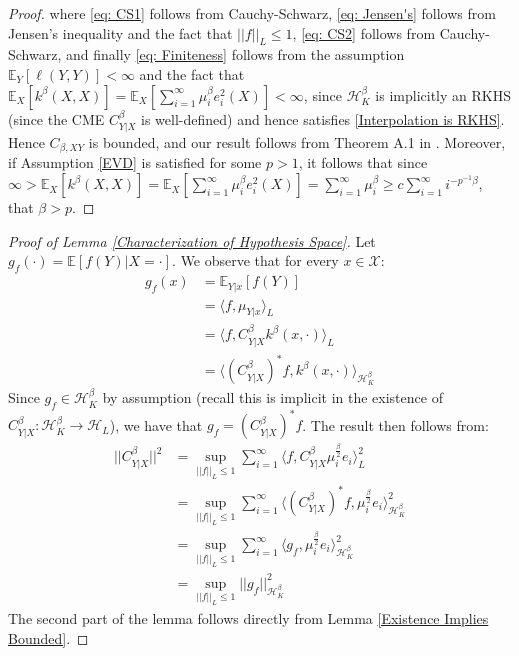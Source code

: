 \documentclass[accepted]{article}
\theoremstyle{definition}
\begin{document}
\begin{proof}
where \eqref{eq: CS1} follows from Cauchy-Schwarz, \eqref{eq: Jensen's} follows from Jensen's inequality and the fact that $||f||_{L} \leq 1$, \eqref{eq: CS2} follows from Cauchy-Schwarz, and finally \eqref{eq: Finiteness} follows from the assumption $\mathbb{E}_Y[\ell(Y, Y)] < \infty$ and the fact that $\mathbb{E}_{X}[k^{\beta}(X, X)] = \mathbb{E}_{X}[\sum_{i = 1}^{\infty} \mu^{\beta}_i e^2_i(X)] < \infty$, since $\mathcal{H}^{\beta}_{K}$ is implicitly an RKHS (since the CME $C^{\beta}_{Y|X}$ is well-defined) and hence satisfies \eqref{Interpolation is RKHS}. Hence $C_{\beta, XY}$ is bounded, and our result follows from Theorem A.1 in \cite{klebanov2020rigorous}. Moreover, if Assumption \ref{EVD} is satisfied for some $p > 1$, it follows that since $\infty > \mathbb{E}_{X}[k^{\beta}(X, X)] = \mathbb{E}_{X}[\sum_{i = 1}^{\infty} \mu^{\beta}_i e^2_i(X)] = \sum_{i = 1}^{\infty} \mu^{\beta}_i \geq c\sum_{i = 1}^{\infty} i^{-p^{-1}\beta}$, that $\beta > p$. 
\end{proof}
\begin{proof}[Proof of Lemma \ref{Characterization of Hypothesis Space}]
Let $g_f(\cdot) = \mathbb{E}[f(Y)|X = \cdot]$. We observe that for every $x \in \mathcal{X}$: 
\begin{align}
    g_f(x) & = \mathbb{E}_{Y|x}[f(Y)] \\
    & = \langle f, \mu_{Y|x} \rangle_{L} \\
    & = \langle f, C^{\beta}_{Y|X} k^{\beta}(x, \cdot) \rangle_{L} \\
    & = \langle (C^{\beta}_{Y|X})^{*} f, k^{\beta}(x, \cdot) \rangle_{\mathcal{H}^{\beta}_K} 
\end{align}
Since $g_f \in \mathcal{H}^{\beta}_K$ by assumption (recall this is implicit in the existence of $C^{\beta}_{Y|X}: \mathcal{H}^{\beta}_K \to \mathcal{H}_L$), we have that $g_f = (C^{\beta}_{Y|X})^{*} f$. The result then follows from:
\begin{align*}
    ||C^{\beta}_{Y|X}||^2 &= \sup_{||f||_L \leq 1} \sum_{i = 1}^{\infty} \langle f, C^{\beta}_{Y|X} \mu_i^{\frac{\beta}{2}} e_i \rangle_{L}^2  \\
    & = \sup_{||f||_L \leq 1} \sum_{i = 1}^{\infty} \langle (C^{\beta}_{Y|X})^{*}f,  \mu_i^{\frac{\beta}{2}} e_i \rangle_{\mathcal{H}^{\beta}_K}^2 \\
    & = \sup_{||f||_L \leq 1} \sum_{i = 1}^{\infty} \langle g_f, \mu_i^{\frac{\beta}{2}} e_i \rangle_{\mathcal{H}^{\beta}_K}^2 \\
    & = \sup_{||f||_L \leq 1} ||g_f||^2_{\mathcal{H}^\beta_K}
\end{align*}
The second part of the lemma follows directly from Lemma \ref{Existence Implies Bounded}. 
\end{proof}
\end{document}
